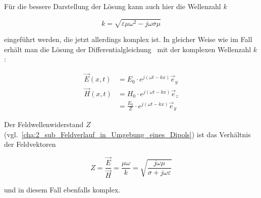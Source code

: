 Für die bessere Darstellung der Lösung kann auch hier die Wellenzahl $k$ 

\begin{equation}
    k = \sqrt{\varepsilon \mu \omega^2 - j \omega \sigma \mu}
\end{equation}

eingeführt werden, die jetzt allerdings komplex ist. In gleicher Weise wie im Fall~ erhält man die Lösung der Differentialgleichung~\cite{Methoden_physikalischer_Mathematik_Band_2} mit der komplexen Wellenzahl $k$:

\begin{subequations}
    \begin{align}
        \vec E(x,t) &= E_0 \cdot e^{j (\omega t - k x)} \vec e_y \\
        \vec H(x,t) &= H_0 \cdot e^{j (\omega t - k x)} \vec e_z \nonumber \\
                    &= \frac{E_0}{Z} \cdot e^{j (\omega t - k x)} \vec e_y
    \end{align}
    \label{eq:A_Wellengleichungen_mit_Leitfaehigkeit}
\end{subequations}

Der Feldwellenwiderstand $Z$ (vgl.~\Abschnitt \ref{cha:2_sub_Feldverlauf_in_Umgebung_eines_Dipols}) ist das Verhältnis der Feldvektoren

\begin{equation}
    Z = \frac{\vec E}{\vec H} = \frac{\mu \omega}{k} = \sqrt{\frac{j \omega \mu}{\sigma + j \omega \varepsilon}}
\end{equation}

und in diesem Fall ebenfalls komplex.




